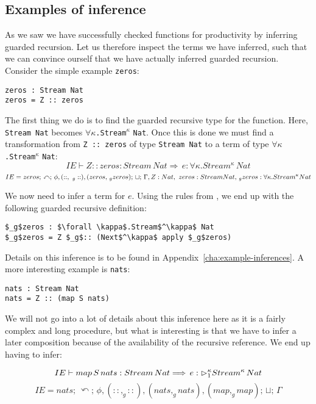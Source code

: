 \subsection{Examples of inference}
As we saw we have successfully checked functions for productivity by inferring
guarded recursion. Let us therefore inspect the terms we have inferred, such
that we can convince ourself that we have actually inferred guarded
recursion. Consider the simple example \texttt{zeros}:

\begin{lstlisting}[mathescape]
zeros : Stream Nat
zeros = Z :: zeros
\end{lstlisting}

The first thing we do is to find the guarded
recursive type for the function. Here, \texttt{Stream Nat} becomes $\forall
\kappa$\texttt{.Stream}$^\kappa$ \texttt{Nat}. Once this is done we must find a
transformation from \texttt{Z :: zeros} of type \texttt{Stream Nat} to a term of
type $\forall \kappa$\texttt{.Stream}$^\kappa$ \texttt{Nat}:
\[
IE \vdash Z :: zeros : Stream\,Nat\Longrightarrow \,e : \forall \kappa.Stream^\kappa \,Nat
\]
\[
IE = zeros;\, \curvearrowleft ;\,\phi, (::,\ _g::), (zeros,\, _gzeros);\, \sqcup;\,
\Gamma,Z : Nat,\ zeros : Stream Nat,\,_gzeros : \forall\kappa.Stream^\kappa Nat
\]

We now need to infer a term for $e$. Using the rules from , we
end up with the following guarded recursive definition:

\begin{lstlisting}[mathescape]
$_g$zeros : $\forall \kappa$.Stream$^\kappa$ Nat
$_g$zeros = Z $_g$:: (Next$^\kappa$ apply $_g$zeros)
\end{lstlisting}

Details on this inference is to be found in
Appendix~\ref{cha:example-inferences}. A more interesting example is
\texttt{nats}: 

\begin{lstlisting}[mathescape]
nats : Stream Nat
nats = Z :: (map S nats)
\end{lstlisting}

We will not go into a lot of details about this inference here as it is a fairly
complex and long procedure, but what is interesting is that we have to infer a
later composition because of the availability of the recursive reference. We end
up having to infer:

\[
IE \vdash map\,S\,nats : Stream\,Nat\Longrightarrow \,e : \rhd^\kappa_1 Stream^\kappa \,Nat
\]
\[
IE = nats;\, \curvearrowleft ;\,\phi, (::, _g::), (nats, _gnats), (map, _gmap);\, \sqcup;\, \Gamma
\]

